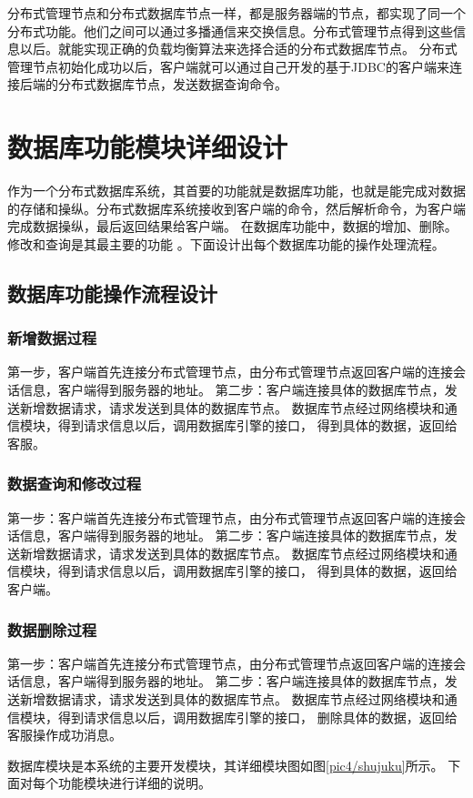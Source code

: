 分布式管理节点和分布式数据库节点一样，都是服务器端的节点，都实现了同一个分布式功能。他们之间可以通过多播通信来交换信息。分布式管理节点得到这些信息以后。就能实现正确的负载均衡算法来选择合适的分布式数据库节点。
分布式管理节点初始化成功以后，客户端就可以通过自己开发的基于JDBC的客户端来连接后端的分布式数据库节点，发送数据查询命令。
\section{数据库功能模块详细设计}
作为一个分布式数据库系统，其首要的功能就是数据库功能，也就是能完成对数据的存储和操纵。分布式数据库系统接收到客户端的命令，然后解析命令，为客户端完成数据操纵，最后返回结果给客户端。
在数据库功能中，数据的增加、删除。修改和查询是其最主要的功能
。下面设计出每个数据库功能的操作处理流程。
\subsection{数据库功能操作流程设计}
\subsubsection{新增数据过程}
第一步，客户端首先连接分布式管理节点，由分布式管理节点返回客户端的连接会话信息，客户端得到服务器的地址。
第二步：客户端连接具体的数据库节点，发送新增数据请求，请求发送到具体的数据库节点。
数据库节点经过网络模块和通信模块，得到请求信息以后，调用数据库引擎的接口，
得到具体的数据，返回给客服。
\subsubsection{数据查询和修改过程}
第一步：客户端首先连接分布式管理节点，由分布式管理节点返回客户端的连接会话信息，客户端得到服务器的地址。
第二步：客户端连接具体的数据库节点，发送新增数据请求，请求发送到具体的数据库节点。
数据库节点经过网络模块和通信模块，得到请求信息以后，调用数据库引擎的接口，
得到具体的数据，返回给客户端。
\subsubsection{数据删除过程}
第一步：客户端首先连接分布式管理节点，由分布式管理节点返回客户端的连接会话信息，客户端得到服务器的地址。
第二步：客户端连接具体的数据库节点，发送新增数据请求，请求发送到具体的数据库节点。
数据库节点经过网络模块和通信模块，得到请求信息以后，调用数据库引擎的接口，
删除具体的数据，返回给客服操作成功消息。

数据库模块是本系统的主要开发模块，其详细模块图如图\ref{pic4/shujuku}所示。
下面对每个功能模块进行详细的说明。
